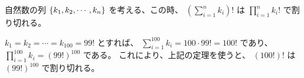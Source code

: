 \begin{Theorem}
  自然数の列 $\left\{ k_1, k_2, \cdots, k_n \right\}$ を考える、この時、
  $\left( \sum_{i=1}^{n} k_i \right) !$ は
  $\prod_{i=1}^{n} k_i !$ で割り切れる。
\end{Theorem}

$k_1 = k_2 = \cdots = k_{100} = 99!$ とすれば、
$\sum_{i=1}^{100} k_i = 100 \cdot 99! = 100!$ であり、
$\prod_{i=1}^{100} k_i = (99!)^{100} $ である。
これにより、上記の定理を使うと、
$(100!)!$ は $(99!)^{100}$ で割り切れる。
\QED



